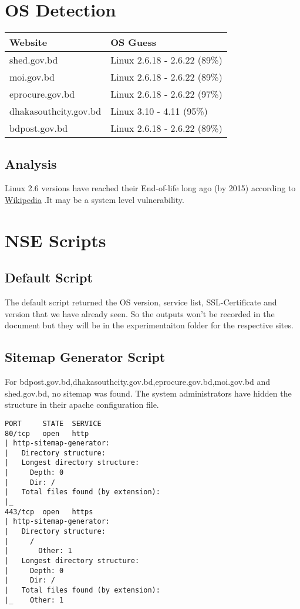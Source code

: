 \documentclass[11pt]{article}
\begin{document}
\section{OS Detection}
\label{sec:org264f5eb}
\begin{center}
\begin{tabular}{ll}
Website & OS Guess\\
\hline
shed.gov.bd & Linux 2.6.18 - 2.6.22 (89\%)\\
moi.gov.bd & Linux 2.6.18 - 2.6.22 (89\%)\\
eprocure.gov.bd & Linux 2.6.18 - 2.6.22 (97\%)\\
dhakasouthcity.gov.bd & Linux 3.10 - 4.11 (95\%)\\
bdpost.gov.bd & Linux 2.6.18 - 2.6.22 (89\%)\\
\end{tabular}
\end{center}
\subsection{Analysis}
\label{sec:orgf1a648b}
Linux 2.6 versions have reached their End-of-life long ago (by 2015) according to \href{https://en.wikipedia.org/wiki/Linux\_kernel\_version\_history}{Wikipedia} .It may be a system level vulnerability.\\
\section{NSE Scripts}
\label{sec:orgcb0a600}
\subsection{Default Script}
\label{sec:orgaf1477d}
The default script returned the OS version, service list, SSL-Certificate and version that we have already seen. So the outputs won't be recorded in the document but they will be in the experimentaiton folder for the respective sites.\\
\subsection{Sitemap Generator Script}
\label{sec:org56503cc}
For bdpost.gov.bd,dhakasouthcity.gov.bd,eprocure.gov.bd,moi.gov.bd and shed.gov.bd,  no sitemap was found. The system administrators have hidden the structure in their apache configuration file.\\
\begin{verbatim}
PORT     STATE  SERVICE
80/tcp   open   http
| http-sitemap-generator: 
|   Directory structure:
|   Longest directory structure:
|     Depth: 0
|     Dir: /
|   Total files found (by extension):
|_    
443/tcp  open   https
| http-sitemap-generator: 
|   Directory structure:
|     /
|       Other: 1
|   Longest directory structure:
|     Depth: 0
|     Dir: /
|   Total files found (by extension):
|_    Other: 1
\end{verbatim}
\end{document}
